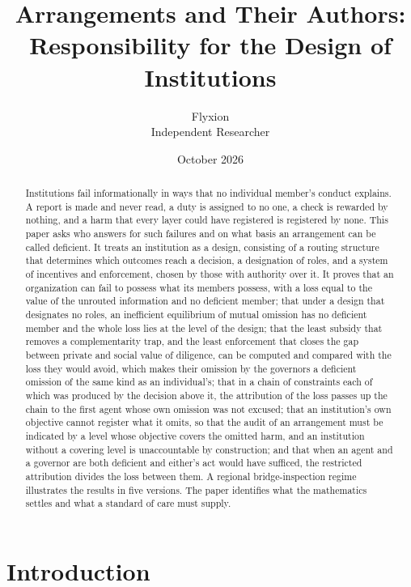 \documentclass[11pt]{article}
\title{Arrangements and Their Authors:\\Responsibility for the Design of Institutions}
\author{Flyxion\\Independent Researcher}
\date{October 2026}
\theoremstyle{plain}
\theoremstyle{definition}
\begin{document}
\maketitle

\begin{abstract}
\noindent Institutions fail informationally in ways that no individual member's conduct explains. A report is made and never read, a duty is assigned to no one, a check is rewarded by nothing, and a harm that every layer could have registered is registered by none. This paper asks who answers for such failures and on what basis an arrangement can be called deficient. It treats an institution as a design, consisting of a routing structure that determines which outcomes reach a decision, a designation of roles, and a system of incentives and enforcement, chosen by those with authority over it. It proves that an organization can fail to possess what its members possess, with a loss equal to the value of the unrouted information and no deficient member; that under a design that designates no roles, an inefficient equilibrium of mutual omission has no deficient member and the whole loss lies at the level of the design; that the least subsidy that removes a complementarity trap, and the least enforcement that closes the gap between private and social value of diligence, can be computed and compared with the loss they would avoid, which makes their omission by the governors a deficient omission of the same kind as an individual's; that in a chain of constraints each of which was produced by the decision above it, the attribution of the loss passes up the chain to the first agent whose own omission was not excused; that an institution's own objective cannot register what it omits, so that the audit of an arrangement must be indicated by a level whose objective covers the omitted harm, and an institution without a covering level is unaccountable by construction; and that when an agent and a governor are both deficient and either's act would have sufficed, the restricted attribution divides the loss between them. A regional bridge-inspection regime illustrates the results in five versions. The paper identifies what the mathematics settles and what a standard of care must supply.
\end{abstract}

\section{Introduction}\label{sec:intro}
\end{document}
